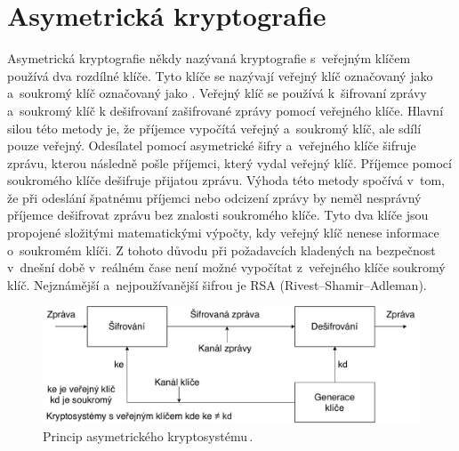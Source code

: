 \section{Asymetrická kryptografie}
Asymetrická kryptografie někdy nazývaná kryptografie s~veřejným klíčem používá dva rozdílné klíče. Tyto klíče se nazývají veřejný klíč označovaný jako  a~soukromý klíč označovaný jako . Veřejný klíč se používá k~šifrovaní zprávy a~soukromý klíč k dešifrovaní zašifrované zprávy pomocí veřejného klíče. Hlavní silou této metody je, že příjemce vypočítá veřejný a~soukromý klíč, ale sdílí pouze veřejný. Odesílatel pomocí asymetrické šifry a~veřejného klíče šifruje zprávu, kterou následně pošle příjemci, který vydal veřejný klíč. Příjemce pomocí soukromého klíče dešifruje přijatou zprávu. Výhoda této metody spočívá v~tom, že při odeslání špatnému příjemci nebo odcizení zprávy by neměl nesprávný příjemce dešifrovat zprávu bez znalosti soukromého klíče. Tyto dva klíče jsou propojené složitými matematickými výpočty, kdy veřejný klíč nenese informace o~soukromém klíči. Z tohoto důvodu při požadavcích kladených na bezpečnost v~dnešní době v~reálném čase není možné vypočítat z~veřejného klíče soukromý klíč. Nejznámější a~nejpoužívanější šifrou je RSA
(Rivest\nobreakdash--Shamir\nobreakdash--Adleman).\cite{Nigel9780077099879ISBN}
\begin{figure}[!h]
  \begin{center}
    \includegraphics[scale=0.5]{obrazky/AsymmetricCrutosystem.pdf}
  \end{center}
  \caption[Princip asymetrického kryptosystému]{Princip asymetrického kryptosystému\,\cite{Mao0130669431ISBN}.}%
  \label{img:asymmetricCrypto}
\end{figure}
